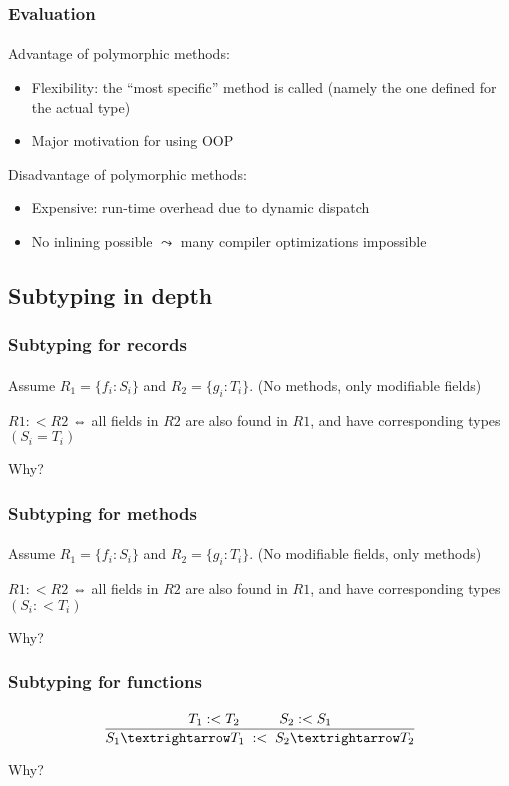 \documentclass{beamer}
\begin{document}
\begin{frame}[fragile]
\frametitle{Evaluation}
\framesubtitle{}
Advantage of polymorphic methods: 
\begin{itemize}
\item Flexibility: the ``most specific'' method is called
(namely the one defined for the actual type)
\item Major motivation for using OOP
\end{itemize}
\bigskip

Disadvantage of polymorphic methods: 
\begin{itemize}
\item Expensive: run-time overhead due to dynamic dispatch
\item No inlining possible $\leadsto$ many compiler optimizations
impossible
\end{itemize}

\end{frame}


\subsection{Subtyping in depth}


\begin{frame}
\frametitle{Subtyping for records}
\framesubtitle{}

Assume $R_1 = \{f_i : S_i\}$ and $R_2 = \{g_i : T_i\}$.
(No methods, only modifiable fields)

$R1 :< R2$ ⇔ all fields in $R2$ are also found in $R1$, and have corresponding types $(S_i = T_i)$

Why?
\end{frame}


\begin{frame}
\frametitle{Subtyping for methods}
\framesubtitle{}

Assume $R_1 = \{f_i : S_i\}$ and $R_2 = \{g_i : T_i\}$.
(No modifiable fields, only methods)

$R1 :< R2$ ⇔ all fields in $R2$ are also found in $R1$, and have corresponding types $(S_i :< T_i)$

Why?

\end{frame}


\begin{frame}
\frametitle{Subtyping for functions}
\framesubtitle{}

\[
\frac{\; T_1 :< T_2 \mbox{\hspace{1cm}}  S_2 :< S_1 \;}{S_1 → T_1 \; :< \; S_2 → T_2}
\]

Why?

\end{frame}
\end{document}
